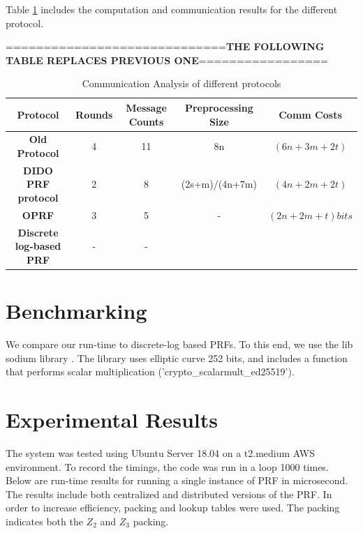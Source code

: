 Table \ref{CommunicationCosts} includes the computation and communication results for the different protocol.

=============================\textbf{THE FOLLOWING TABLE REPLACES PREVIOUS ONE}=================
\begin{table}[htbp]
	\label{CommunicationCosts}
	\begin{center}
		\begin{tabular}{|c|c|c|c|c|}
			\hline
			\textbf{Protocol} & \textbf{Rounds}  & \textbf{Message Counts} &  \textbf{Preprocessing Size} & \textbf{Comm Costs}  \\
			\hline
			\hline
			\textbf{Old Protocol}  & 4  & 11 & 8n & $(6n+3m+2t)$ \\
			\hline
			\textbf{DIDO PRF protocol} & 2	& 8 & (2s+m)/(4n+7m) & $(4n+2m+2t)$  	\\
			\hline
			\textbf{OPRF} & 3 & 5 & - &  $(2n+2m+t) bits$	\\
			\hline
			\textbf{Discrete log-based PRF} &  - & - &  & \\
			\hline
			
		\end{tabular}
		
		\vspace{-1mm}
		\caption{Communication Analysis of different protocols}
		\label{CommunicationCosts}
	\end{center}
	\vspace{-5mm}
\end{table}


\section{Benchmarking}

We compare our run-time to discrete-log based PRFs. To this end, we use the lib sodium library \cite{LibSodium}. The library uses elliptic curve 252 bits, and includes a function that performs scalar multiplication ('crypto\_scalarmult\_ed25519').


\section{Experimental Results}

The system was tested using Ubuntu Server 18.04 on a t2.medium AWS environment. To record the timings, the code was run in a loop 1000 times. Below are run-time results for running a single instance of PRF in microsecond. The results include both centralized and distributed versions of the PRF. In order to increase efficiency, packing and lookup tables were used. The packing indicates both the $Z_2$ and $Z_3$ packing.

